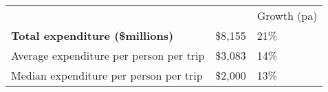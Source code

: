 \begin{tabular}[t]{p{4.85cm}>{\hfill}p{1.3cm}>{\hfill}p{1.35cm}}
    &   & Growth (pa) \\ 
 \textbf{Total expenditure (\$millions)} & \$8,155 & 21\% \\ 
  Average expenditure per person per trip & \$3,083 & 14\% \\ 
  Median expenditure per person per trip & \$2,000 & 13\% \\ 
  \end{tabular}
